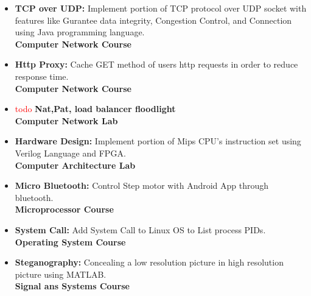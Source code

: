 \documentclass[a4paper,10pt]{article} %
\begin{document}
\begin{itemize}
\begin{itemize}
		\item
			\textbf{TCP over UDP: } Implement portion of TCP protocol over UDP socket with features like Gurantee data integrity, Congestion Control, and Connection using Java programming language.\\
			\textbf {Computer Network Course}
			
		\item
			\textbf {Http Proxy:} Cache GET method of users http requests in order to reduce response time. \\
			\textbf {Computer Network Course}
			
		\item
			\textcolor{red}{todo}
			\textbf{Nat,Pat, load balancer floodlight}\\
			\textbf {Computer Network Lab}
		
		
		\item
			\textbf{Hardware Design:} Implement portion of Mips CPU's instruction set using Verilog Language and FPGA. \\
			\textbf {Computer Architecture Lab}
			
		\item
			\textbf {Micro Bluetooth:} Control Step motor with Android App through bluetooth.\\
			\textbf {Microprocessor Course}
		
		\item
			\textbf {System Call:} Add System Call to Linux OS to List process PIDs. \\
			\textbf {Operating System Course}
				
		\item
			\textbf{Steganography:} Concealing a low resolution picture in high resolution picture using MATLAB. \\
			\textbf {Signal ans Systems Course}
		
	\end{itemize}

	
\end{itemize}
\end{document}
